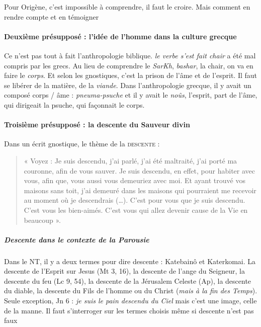 \begin{Synthesis}
     Pour Origène, c'est impossible à comprendre, il faut le croire. Mais comment en rendre compte et en témoigner
\end{Synthesis}




    \paragraph{Deuxième présupposé : l'idée de l'homme dans la culture grecque}

Ce n'est pas tout à fait l'anthropologie biblique. \emph{le verbe s'est fait chair} a été mal compris par les grecs. Au lieu de comprendre le \emph{SarKh}, \textit{bashar}, la chair, on va en faire le \textit{corps}. Et selon les gnostiques, c'est la prison de l'âme et de l'esprit. Il faut se libérer de la matière, de la \textit{viande}. 
Dans l'anthropologie grecque, il y avait un composé corps / âme : \textit{pneuma-psuche} et il y avait le \textit{noûs}, l'esprit, part de l'âme, qui dirigeait la psuche, qui façonnait le corps.


    \paragraph{Troisième présupposé : la descente du Sauveur divin}

Dans un écrit gnostique, le thème de la \textsc{descente} : 
\begin{quote}

« Voyez : Je suis descendu, j'ai parlé, j'ai été maltraité, j'ai porté
ma couronne, afin de vous sauver. Je suis descendu, en effet, pour
habiter avec vous, afin que, vous aussi vous demeuriez avec moi. Et
ayant trouvé vos maisons sans toit, j'ai demeuré dans les maisons qui
pourraient me recevoir au moment où je descendrais (\ldots). C'est pour
vous que je suis descendu. C'est vous les bien-aimés. C'est vous qui
allez devenir cause de la Vie en beaucoup ».

\end{quote}
\subparagraph{Descente dans le contexte de la Parousie}
Dans le NT, il y a deux termes pour dire descente : Katebainô et Katerkomai. La descente de l'Esprit sur Jesus (Mt 3, 16), la descente de l'ange du Seigneur, la descente du feu (Lc 9, 54), la descente de la Jérusalem Celeste (Ap), la descente du diable, la descente du Fils de l'homme ou du Christ (\textit{mais à la fin des Temps}).
Seule exception, Jn 6 : \textit{je suis le pain descendu du Ciel} mais c'est une image, celle de la manne. Il faut s'interroger sur les termes choisis même si descente n'est pas faux

